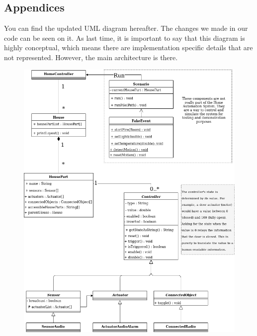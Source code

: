   \newpage
  \begin{appendices}
  	\section*{Appendices}
		You can find the updated UML diagram hereafter. The changes we made in our code can be seen on it.
		As last time, it is important to say that this diagram is highly conceptual, which means there are implementation specific details that are not represented. However, the main architecture is there.
		
		\begin{figure}[H]
			\centering
			\includegraphics[scale=0.49]{UML-diagram_updated.png}
		\end{figure}
	

\end{appendices}
